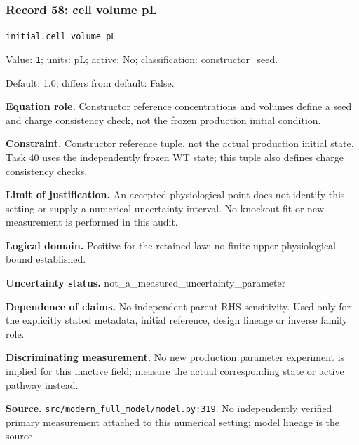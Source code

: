 \subsubsection*{Record 58: cell volume pL}
{\small \nolinkurl{initial.cell_volume_pL}\par

Value: \texttt{1}; units: pL; active: No; classification: constructor\_seed.\par

Default: 1.0; differs from default: False.\par

\textbf{Equation role.} Constructor reference concentrations and volumes define a seed and charge consistency check, not the frozen production initial condition.\par

\textbf{Constraint.} Constructor reference tuple, not the actual production initial state. Task 40 uses the independently frozen WT state; this tuple also defines charge consistency checks.\par

\textbf{Limit of justification.} An accepted physiological point does not identify this setting or supply a numerical uncertainty interval. No knockout fit or new measurement is performed in this audit.\par

\textbf{Logical domain.} Positive for the retained law; no finite upper physiological bound established.\par

\textbf{Uncertainty status.} not\_a\_measured\_uncertainty\_parameter\par

\textbf{Dependence of claims.} No independent parent RHS sensitivity. Used only for the explicitly stated metadata, initial reference, design lineage or inverse family role.\par

\textbf{Discriminating measurement.} No new production parameter experiment is implied for this inactive field; measure the actual corresponding state or active pathway instead.\par

\textbf{Source.} \nolinkurl{src/modern_full_model/model.py:319}. No independently verified primary measurement attached to this numerical setting; model lineage is the source.\par}

